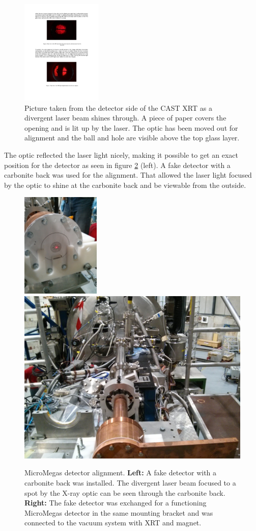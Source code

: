 \begin{figure}[htbp]
  \centering
    \includegraphics[height=5cm]{figures/cast/ballandhole.pdf}
  \caption{\footnotesize Picture taken from the detector side of the CAST XRT as a divergent laser beam shines through. A piece of paper covers the opening and is lit up by the laser. The optic has been moved out for alignment and the ball and hole are visible above the top glass layer.}
  \label{fig:ball_and_hole}
\end{figure}

The optic reflected the laser light nicely, making it possible to get an exact position for the detector as seen in figure \ref{fig:cast_align} (left). A fake detector with a carbonite back was used for the alignment. That allowed the laser light focused by the optic to shine at the carbonite back and be viewable from the outside.

\begin{figure}[htbp]
  \centering
    \includegraphics[height=5cm]{figures/cast/castxrt_alignment1.jpg}
    \hspace{20pt}
    \includegraphics[width=0.45\linewidth]{figures/cast/castxrt_alignment2.jpg}
  \caption{\footnotesize MicroMegas detector alignment. \textbf{Left:} A fake detector with a carbonite back was installed. The divergent laser beam focused to a spot by the X-ray optic can be seen through the carbonite back. \textbf{Right:} The fake detector was exchanged for a functioning MicroMegas detector in the same mounting bracket and was connected to the vacuum system with XRT and magnet.}
  \label{fig:cast_align}
\end{figure}

